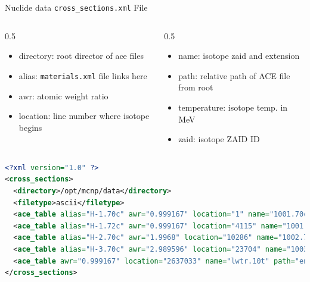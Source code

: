 \documentclass[serif]{beamer}
\begin{document}

\begin{frame}[fragile]{Nuclide data \texttt{cross\_sections.xml} File}
  \begin{columns}
  \begin{column}{0.5\linewidth}
  \begin{itemize}
    \footnotesize
    \item {\color{darkblue}directory}: root director of ace files
    \item {\color{darkblue}alias}: \texttt{materials.xml} file links here
    \item {\color{darkblue}awr}: atomic weight ratio
    \item {\color{darkblue}location}: line number where isotope begins
  \end{itemize}
  \end{column}
  \begin{column}{0.5\linewidth}
    \footnotesize
    \begin{itemize}
      \item {\color{darkblue}name}: isotope zaid and extension
      \item {\color{darkblue}path}: relative path of ACE file from root
      \item {\color{darkblue}temperature}: isotope temp. in MeV
      \item {\color{darkblue}zaid}: isotope ZAID ID
    \end{itemize}
  \end{column}
  \end{columns}
  \vfill
  \begin{scriptsize}
    \begin{lstlisting}[language=XML,basicstyle=\ttfamily\tiny,breaklines=true]
<?xml version="1.0" ?>
<cross_sections>
  <directory>/opt/mcnp/data</directory>
  <filetype>ascii</filetype>
  <ace_table alias="H-1.70c" awr="0.999167" location="1" name="1001.70c" path="endf70a" temperature="2.5301e-08" zaid="1001"/>
  <ace_table alias="H-1.72c" awr="0.999167" location="4115" name="1001.72c" path="endf70a" temperature="7.7556e-08" zaid="1001"/>
  <ace_table alias="H-2.70c" awr="1.9968" location="10286" name="1002.70c" path="endf70a" temperature="2.5301e-08" zaid="1002"/>
  <ace_table alias="H-3.70c" awr="2.989596" location="23704" name="1003.70c" path="endf70a" temperature="2.5301e-08" zaid="1003"/>
  <ace_table awr="0.999167" location="2637033" name="lwtr.10t" path="endf70sab" zaid="0"/>
</cross_sections>
    \end{lstlisting}
  \end{scriptsize}
  \vfill
\end{frame}
\end{document}
